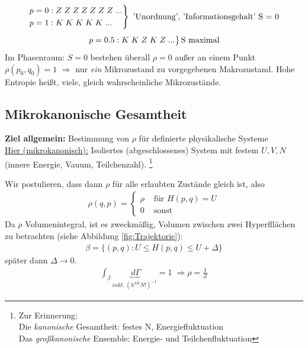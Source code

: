 \documentclass[12pt]{article}
\begin{document}
\begin{align*}
\begin{rcases}
p= 0: Z\; Z\; Z\; Z\; Z\; Z\; Z\; ... \\ 
p= 1: K\; K\; K\; K\; K\;  ...  
\end{rcases}
\text{ 'Unordnung', 'Informationsgehalt' S = 0} \\
\end{align*}
\begin{align*}
\begin{rcases}
p= 0.5: K\; K\; Z\; K\;  Z\; ...
\end{rcases}
\text{S maximal}
\end{align*}
Im Phasenraum: $S=0$ bestehen überall $\rho = 0$ außer an einem Punkt $\rho(p_0, q_0) = 1$ $\Rightarrow$ nur \textit{ein} Mikrozustand zu vorgegebenen Makrozustand. Hohe Entropie heißt, viele, gleich wahrscheinliche Mikrozustände. 

\subsection{Mikrokanonische Gesamtheit}
\textbf{Ziel allgemein:} Bestimmung von $\rho$ für definierte physikalische Systeme \\
\underline{Hier (mikrokanonisch):} Isoliertes (abgeschlossenes) System mit festem $U,V,N$ (innere Energie, Vauum, Teilchenzahl). \footnote{Zur Erinnerung: \\ Die \textit{kanonische} Gesamtheit: festes N, Energiefluktuation\\ Das\textit{ großkanonische} Ensemble: Energie- und Teilchenfluktuation}

Wir postulieren, dass dann $\rho$ für alle erlaubten Zustände gleich ist, also
\begin{align}
\rho (q,p) = 
\begin{cases}
\rho  & \mbox{ für } H(p,q) = U \\
0 & \mbox{ sonst }
\end{cases}
\end{align}
Da $\rho $ Volumenintegral, ist es zweckmäßig, Volumen zwischen zwei Hyperfllächen zu betrachten (siehe Abbildung \ref{fig:Trajektorie}):
\begin{align}
\beta = \{ (p,q): U \leq H (p,q) \leq U +\Delta \}
\end{align}
später dann $\Delta \to 0$. 
\begin{align}
\int_\beta \underbrace{ \; d \Gamma }_{ inkl.  \; (h^{3N} N!)^{-1}  } = 1 \; \Rightarrow \rho = \frac{1}{Z}
\end{align} 
\end{document}
